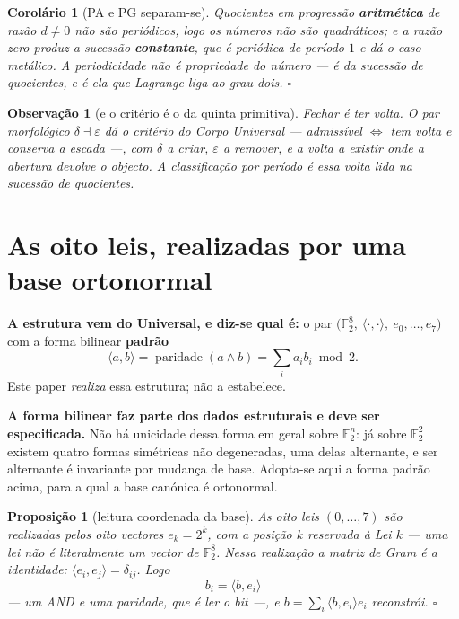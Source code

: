 \documentclass[11pt,a4paper]{article}
\newtheorem{proposicao}[teorema]{Proposição}
\newtheorem{corolario}[teorema]{Corolário}
\newtheorem{observacao}{Observação}
\begin{document}
\begin{corolario}[PA e PG separam-se]\label{cor:papg}
Quocientes em progressão \textbf{aritmética} de razão $d\neq0$ não são periódicos,
logo os números não são quadráticos; e a razão zero produz a sucessão \textbf{constante},
que é periódica de período $1$ e dá o caso metálico. \emph{A periodicidade não é propriedade do número --- é da
sucessão de quocientes, e é ela que Lagrange liga ao grau dois.} $\square$
\end{corolario}

\begin{observacao}[e o critério é o da quinta primitiva]
Fechar é \emph{ter volta}. O par morfológico $\delta\dashv\varepsilon$ dá o
critério do \emph{Corpo Universal} --- \emph{admissível $\iff$ tem volta e conserva
a escada} ---, com $\delta$ a criar, $\varepsilon$ a remover, e a volta a existir
onde a abertura devolve o objecto. A classificação por período é essa volta lida na
sucessão de quocientes.
\end{observacao}

\section{As oito leis, realizadas por uma base ortonormal}\label{sec:orto}

\textbf{A estrutura vem do Universal, e diz-se qual é:} o par
$\bigl(\mathbb{F}_2^{8},\ \langle\cdot,\cdot\rangle,\ e_0,\ldots,e_7\bigr)$
com a forma bilinear \textbf{padrão}
\[
\langle a,b\rangle=\operatorname{paridade}(a\wedge b)
=\textstyle\sum_i a_ib_i\bmod2 .
\]
Este paper \emph{realiza} essa estrutura; não a estabelece.

\medskip
\noindent\textbf{A forma bilinear faz parte dos dados estruturais e deve ser
especificada.} Não há unicidade dessa forma em geral sobre $\mathbb{F}_2^{n}$: já
sobre $\mathbb{F}_2^{2}$ existem quatro formas simétricas não degeneradas, uma
delas alternante, e ser alternante é invariante por mudança de base. Adopta-se
aqui a forma padrão acima, para a qual a base canónica é ortonormal.

\begin{proposicao}[leitura coordenada da base]\label{thm:orto}
As oito leis $(0,\ldots,7)$ são \emph{realizadas} pelos oito vectores
$e_k=2^{k}$, com a posição $k$ reservada à Lei $k$ --- uma lei não é literalmente um
vector de $\mathbb{F}_2^{8}$. Nessa realização a matriz de Gram é a identidade:
$\langle e_i,e_j\rangle=\delta_{ij}$. Logo
\[
\boxed{\;b_i=\langle b,e_i\rangle\;}
\]
--- um AND e uma paridade, que é \emph{ler o bit} ---, e
$b=\sum_i\langle b,e_i\rangle e_i$ reconstrói. $\square$
\end{proposicao}
\end{document}
